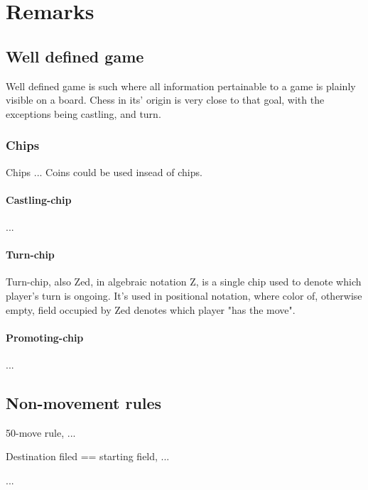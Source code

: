
\chapter*{Remarks}
\label{ch:Remarks}

\section*{Well defined game}
\label{sec:Remarks/Well defined game}

Well defined game is such where all information pertainable to a game
is plainly visible on a board. Chess in its' origin is very close to
that goal, with the exceptions being castling, and turn.

\subsection*{Chips}
\label{sec:Remarks/Chips}
Chips ...
Coins could be used insead of chips.

\subsubsection*{Castling-chip}
\label{sec:Remarks/Chips/Castling-chip}
...

\subsubsection*{Turn-chip}
\label{sec:Remarks/Chips/Turn-chip}
Turn-chip, also Zed, in algebraic notation Z, is a single chip used to
denote which player's turn is ongoing. It's used in positional notation,
where color of, otherwise empty, field occupied by Zed denotes which
player "has the move".

\subsubsection*{Promoting-chip}
\label{sec:Remarks/Chips/Promoting-chip}
...

\section*{Non-movement rules}
\label{sec:Remarks/Non-movement rules}

50-move rule, ...

Destination filed == starting field, ...

...

\clearpage %
